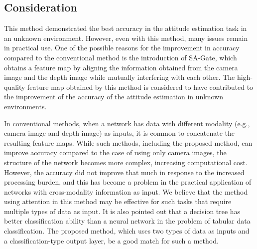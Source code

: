 \subsection{Consideration}\label{sec:consideration}
This method demonstrated the best accuracy in the attitude estimation task in an unknown environment. However, even with this method, many issues remain in practical use. One of the possible reasons for the improvement in accuracy compared to the conventional method is the introduction of SA-Gate, which obtains a feature map by aligning the information obtained from the camera image and the depth image while mutually interfering with each other. The high-quality feature map obtained by this method is considered to have contributed to the improvement of the accuracy of the attitude estimation in unknown environments.


In conventional methods, when a network has data with different modality (e.g., camera image and depth image) as inputs, it is common to concatenate the resulting feature maps\cite{ozaki_robosym}\cite{SAGATE}\cite{RGBD_1}\cite{RGBD_2}. While such methods, including the proposed method, can improve accuracy compared to the case of using only camera images, the structure of the network becomes more complex, increasing computational cost. However, the accuracy did not improve that much in response to the increased processing burden, and this has become a problem in the practical application of networks with cross-modality information as input. We believe that the method using attention in this method\cite{google_LiDAR_camera} may be effective for such tasks that require multiple types of data as input. It is also pointed out that a decision tree has better classification ability than a neural network in the problem of tabular data classification\cite{DL_isnot}. The proposed method, which uses two types of data as inputs and a classification-type output layer, be a good match for such a method.



